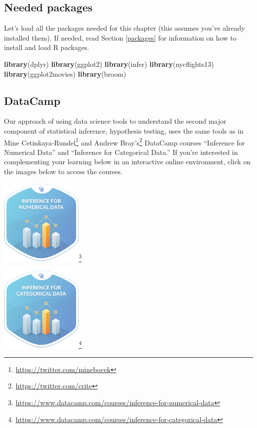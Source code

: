 \documentclass[12pt,]{krantz}
\makeatletter
\newenvironment{Shaded}{\begin{snugshade}}{\end{snugshade}}
\newcommand{\KeywordTok}[1]{\textcolor[rgb]{0.27,0.27,0.27}{\textbf{#1}}}
\newcommand{\NormalTok}[1]{#1}
\renewcommand{\href}[2]{#2\footnote{\url{#1}}}
\newenvironment{kframe}{%
\medskip{}
\setlength{\fboxsep}{.8em}
 \def\at@end@of@kframe{}%
 \ifinner\ifhmode%
  \def\at@end@of@kframe{\end{minipage}}%
  \begin{minipage}{\columnwidth}%
 \fi\fi%
 \def\FrameCommand##1{\hskip\@totalleftmargin \hskip-\fboxsep
 \colorbox{shadecolor}{##1}\hskip-\fboxsep
     \hskip-\linewidth \hskip-\@totalleftmargin \hskip\columnwidth}%
 \MakeFramed {\advance\hsize-\width
   \@totalleftmargin\z@ \linewidth\hsize
   \@setminipage}}%
 {\par\unskip\endMakeFramed%
 \at@end@of@kframe}
\renewenvironment{Shaded}{\begin{kframe}}{\end{kframe}}
\theoremstyle{definition}
\theoremstyle{definition}
\theoremstyle{definition}
\theoremstyle{remark}
\makeatother
\begin{document}
\subsection*{Needed packages}\label{needed-packages-7}


Let's load all the packages needed for this chapter (this assumes you've
already installed them). If needed, read Section \ref{packages} for
information on how to install and load R packages.

\begin{Shaded}
\begin{Highlighting}[]
\KeywordTok{library}\NormalTok{(dplyr)}
\KeywordTok{library}\NormalTok{(ggplot2)}
\KeywordTok{library}\NormalTok{(infer)}
\KeywordTok{library}\NormalTok{(nycflights13)}
\KeywordTok{library}\NormalTok{(ggplot2movies)}
\KeywordTok{library}\NormalTok{(broom)}
\end{Highlighting}
\end{Shaded}

\subsection*{DataCamp}\label{datacamp-6}


Our approach of using data science tools to understand the second major
component of statistical inference, hypothesis testing, uses the same
tools as in \href{https://twitter.com/minebocek}{Mine Cetinkaya-Rundel}
and \href{https://twitter.com/crite}{Andrew Bray's} DataCamp courses
``Inference for Numerical Data'' and ``Inference for Categorical Data.''
If you're interested in complementing your learning below in an
interactive online environment, click on the images below to access the
courses.

\begin{center}
\href{https://www.datacamp.com/courses/inference-for-numerical-data}{\includegraphics[width=0.3\textwidth]{images/datacamp_inference_for_numerical_data.png}}
\end{center}\begin{center}
\href{https://www.datacamp.com/courses/inference-for-categorical-data}{\includegraphics[width=0.3\textwidth]{images/datacamp_inference_for_categorical_data.png}}
\end{center}
\end{document}
